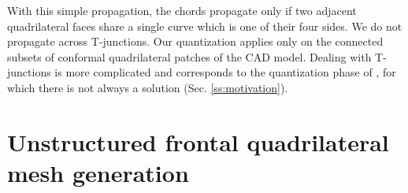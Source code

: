 \documentclass[AMA,STIX1COL]{WileyNJD-v2}
\newcommand\note[1]{\textcolor{red}{// #1}\\}
\newcommand\rsec[1]{Sec. \ref{#1}}
\begin{document}
{With this simple propagation, the chords propagate only if two adjacent
quadrilateral faces share a single curve which is one of their four sides. We
do not propagate across T-junctions.  Our quantization applies only on the
connected subsets of conformal quadrilateral patches of the CAD model.  Dealing
with T-junctions is more complicated and corresponds to the quantization phase
of \cite{campen2015}, for which there is not always a solution
(\rsec{ss:motivation}).


\section{Unstructured frontal quadrilateral mesh generation}

\label{sec:unstructured}

% 
% 
% 

}
\end{document}
